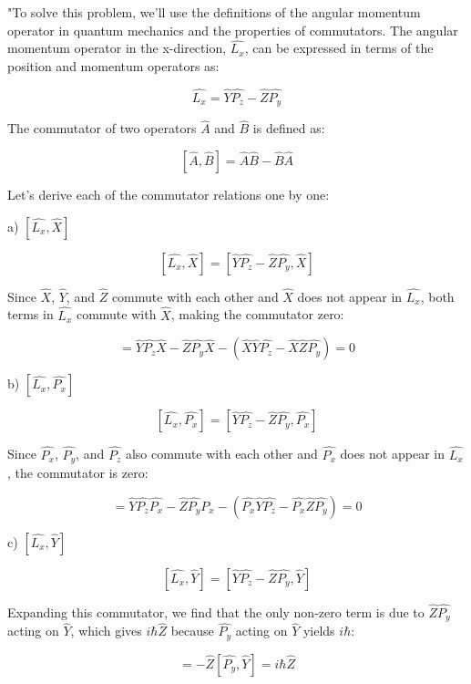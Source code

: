 "To solve this problem, we'll use the definitions of the angular momentum operator in quantum mechanics and the properties of commutators. The angular momentum operator in the x-direction, \( \hat{L_{x}} \), can be expressed in terms of the position and momentum operators as:

\[ \hat{L_{x}} = \hat{Y}\hat{P_{z}} - \hat{Z}\hat{P_{y}} \]

The commutator of two operators \( \hat{A} \) and \( \hat{B} \) is defined as:

\[ \left[ \hat{A}, \hat{B} \right] = \hat{A}\hat{B} - \hat{B}\hat{A} \]

Let's derive each of the commutator relations one by one:

a) \( \left[ \hat{L_{x}}, \hat{X} \right] \)

\[ \left[ \hat{L_{x}}, \hat{X} \right] = \left[ \hat{Y}\hat{P_{z}} - \hat{Z}\hat{P_{y}}, \hat{X} \right] \]

Since \( \hat{X} \), \( \hat{Y} \), and \( \hat{Z} \) commute with each other and \( \hat{X} \) does not appear in \( \hat{L_{x}} \), both terms in \( \hat{L_{x}} \) commute with \( \hat{X} \), making the commutator zero:

\[ = \hat{Y}\hat{P_{z}}\hat{X} - \hat{Z}\hat{P_{y}}\hat{X} - (\hat{X}\hat{Y}\hat{P_{z}} - \hat{X}\hat{Z}\hat{P_{y}}) = 0 \]

b) \( \left[ \hat{L_{x}}, \hat{P_{x}} \right] \)

\[ \left[ \hat{L_{x}}, \hat{P_{x}} \right] = \left[ \hat{Y}\hat{P_{z}} - \hat{Z}\hat{P_{y}}, \hat{P_{x}} \right] \]

Since \( \hat{P_{x}} \), \( \hat{P_{y}} \), and \( \hat{P_{z}} \) also commute with each other and \( \hat{P_{x}} \) does not appear in \( \hat{L_{x}} \), the commutator is zero:

\[ = \hat{Y}\hat{P_{z}}\hat{P_{x}} - \hat{Z}\hat{P_{y}}\hat{P_{x}} - (\hat{P_{x}}\hat{Y}\hat{P_{z}} - \hat{P_{x}}\hat{Z}\hat{P_{y}}) = 0 \]

c) \( \left[ \hat{L_{x}}, \hat{Y} \right] \)

\[ \left[ \hat{L_{x}}, \hat{Y} \right] = \left[ \hat{Y}\hat{P_{z}} - \hat{Z}\hat{P_{y}}, \hat{Y} \right] \]

Expanding this commutator, we find that the only non-zero term is due to \( \hat{Z}\hat{P_{y}} \) acting on \( \hat{Y} \), which gives \( i\hbar\hat{Z} \) because \( \hat{P_{y}} \) acting on \( \hat{Y} \) yields \( i\hbar \):

\[ = - \hat{Z} [ \hat{P_{y}}, \hat{Y} ] = i\hbar \hat{Z} \]

